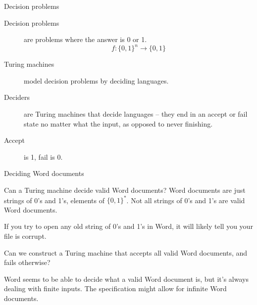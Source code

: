 \begin{frame}{Decision problems}
  \begin{description}
    \item[Decision problems] are problems where the answer is 0 or 1.
    \[ f:\{0,1\}^n \rightarrow \{0,1\} \]
    \item[Turing machines] model decision problems by deciding languages.
    \vspace{0.1cm}
    \item[Deciders] are Turing machines that decide languages -- they end in an accept or fail state no matter what the input, as opposed to never finishing.
    \vspace{0.1cm}
    \item[Accept] is 1, fail is 0.
  \end{description}
\end{frame}

\begin{frame}{Deciding Word documents}
  \begin{alertblock}{Can a Turing machine decide valid Word documents?}
    Word documents are just strings of 0's and 1's, elements of $\{0,1\}^*$.
    Not all strings of 0's and 1's are valid Word documents.
    
    If you try to open any old string of 0's and 1's in Word, it will likely tell you your file is corrupt.
    
    Can we construct a Turing machine that accepts all valid Word documents, and fails otherwise?
    
    Word seems to be able to decide what a valid Word document is, but it's always dealing with finite inputs.
    The specification might allow for infinite Word documents.
  \end{alertblock}
\end{frame}